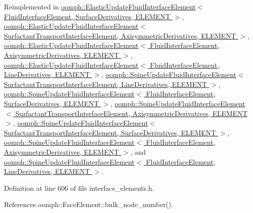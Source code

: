 Reimplemented in \hyperlink{classoomph_1_1ElasticUpdateFluidInterfaceElement_a91c59905720a4417447fcce09032ce7f}{oomph\+::\+Elastic\+Update\+Fluid\+Interface\+Element$<$ Fluid\+Interface\+Element, Surface\+Derivatives, E\+L\+E\+M\+E\+N\+T $>$}, \hyperlink{classoomph_1_1ElasticUpdateFluidInterfaceElement_a91c59905720a4417447fcce09032ce7f}{oomph\+::\+Elastic\+Update\+Fluid\+Interface\+Element$<$ Surfactant\+Transport\+Interface\+Element, Axisymmetric\+Derivatives, E\+L\+E\+M\+E\+N\+T $>$}, \hyperlink{classoomph_1_1ElasticUpdateFluidInterfaceElement_a91c59905720a4417447fcce09032ce7f}{oomph\+::\+Elastic\+Update\+Fluid\+Interface\+Element$<$ Fluid\+Interface\+Element, Axisymmetric\+Derivatives, E\+L\+E\+M\+E\+N\+T $>$}, \hyperlink{classoomph_1_1ElasticUpdateFluidInterfaceElement_a91c59905720a4417447fcce09032ce7f}{oomph\+::\+Elastic\+Update\+Fluid\+Interface\+Element$<$ Fluid\+Interface\+Element, Line\+Derivatives, E\+L\+E\+M\+E\+N\+T $>$}, \hyperlink{classoomph_1_1SpineUpdateFluidInterfaceElement_a8e464c689a19ce2d6fbff2c167dcc41a}{oomph\+::\+Spine\+Update\+Fluid\+Interface\+Element$<$ Surfactant\+Transport\+Interface\+Element, Line\+Derivatives, E\+L\+E\+M\+E\+N\+T $>$}, \hyperlink{classoomph_1_1SpineUpdateFluidInterfaceElement_a8e464c689a19ce2d6fbff2c167dcc41a}{oomph\+::\+Spine\+Update\+Fluid\+Interface\+Element$<$ Fluid\+Interface\+Element, Surface\+Derivatives, E\+L\+E\+M\+E\+N\+T $>$}, \hyperlink{classoomph_1_1SpineUpdateFluidInterfaceElement_a8e464c689a19ce2d6fbff2c167dcc41a}{oomph\+::\+Spine\+Update\+Fluid\+Interface\+Element$<$ Surfactant\+Transport\+Interface\+Element, Axisymmetric\+Derivatives, E\+L\+E\+M\+E\+N\+T $>$}, \hyperlink{classoomph_1_1SpineUpdateFluidInterfaceElement_a8e464c689a19ce2d6fbff2c167dcc41a}{oomph\+::\+Spine\+Update\+Fluid\+Interface\+Element$<$ Surfactant\+Transport\+Interface\+Element, Surface\+Derivatives, E\+L\+E\+M\+E\+N\+T $>$}, \hyperlink{classoomph_1_1SpineUpdateFluidInterfaceElement_a8e464c689a19ce2d6fbff2c167dcc41a}{oomph\+::\+Spine\+Update\+Fluid\+Interface\+Element$<$ Fluid\+Interface\+Element, Axisymmetric\+Derivatives, E\+L\+E\+M\+E\+N\+T $>$}, and \hyperlink{classoomph_1_1SpineUpdateFluidInterfaceElement_a8e464c689a19ce2d6fbff2c167dcc41a}{oomph\+::\+Spine\+Update\+Fluid\+Interface\+Element$<$ Fluid\+Interface\+Element, Line\+Derivatives, E\+L\+E\+M\+E\+N\+T $>$}.



Definition at line 606 of file interface\+\_\+elements.\+h.



References oomph\+::\+Face\+Element\+::bulk\+\_\+node\+\_\+number().

